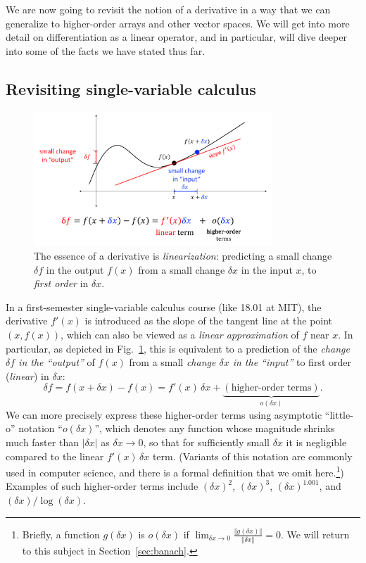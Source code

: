 We are now going to revisit the notion of a derivative in a way that we can generalize to higher-order arrays and other vector spaces. We will get into more detail on differentiation as a linear operator, and in particular, will dive deeper into some of the facts we have stated thus far.

\subsection{Revisiting single-variable calculus}

\begin{figure}
    \centering
    \includegraphics[width=0.8\textwidth]{figures/derivative-linearization.pdf}
    \caption{The essence of a derivative is \emph{linearization}: predicting a small change $\delta f$ in the output $f(x)$ from a small change $\delta x$ in the input $x$, to \emph{first order} in $\delta x$.}
    \label{fig:derivative-linearization}
\end{figure}

In a first-semester single-variable calculus course (like 18.01 at MIT), the derivative $f'(x)$ is  introduced as the slope of the tangent line at the point $(x,f(x))$, which can also be viewed as a \emph{linear approximation} of $f$ near $x$. In particular, as depicted in Fig.~\ref{fig:derivative-linearization}, this is equivalent to a prediction of the \emph{change $\delta f$ in the ``output''} of $f(x)$ from a small \emph{change $\delta x$ in the ``input''} to first order (\emph{linear}) in $\delta x$:
\[
\delta f = f(x+\delta x) - f(x) =  f'(x) \, \delta x  + \underbrace{(\text{higher-order terms})}_{o(\delta x)}.
\]
We can more precisely express these higher-order terms using asymptotic ``little-o'' notation ``$o(\delta x)$'', which denotes any function whose magnitude shrinks much faster than $|\delta x|$ as $\delta x \to 0 $, so that for sufficiently small $\delta x$ it is negligible compared to the linear $f'(x) \, \delta x$ term.  (Variants of this notation are commonly used in computer science, and there is a formal definition that we omit here.\footnote{Briefly, a function $g(\delta x)$ is $o(\delta x)$ if $\lim_{\delta x \to 0} \frac{\Vert g(\delta x) \Vert}{\Vert \delta x \Vert} = 0$.  We will return to this subject in Section~\ref{sec:banach}.})  Examples of such higher-order terms include $(\delta x)^2$, $(\delta x)^3$, $(\delta x)^{1.001}$, and $(\delta x)/\log(\delta x)$.

